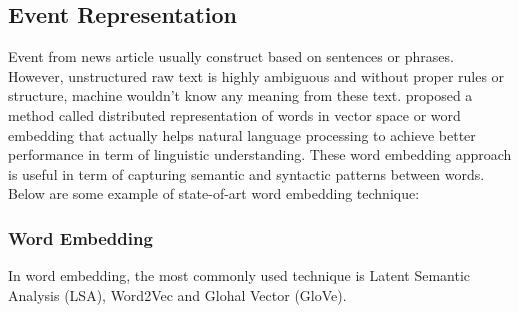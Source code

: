 \documentclass[twoside]{utmthesis}
\begin{document}
\subsection{Event Representation}
Event from news article usually construct based on sentences or phrases. However, unstructured raw text is highly ambiguous and without proper rules or structure, machine wouldn't know any meaning from these text. \citep{mikolov2013distributed} proposed a method called distributed representation of words in vector space or word embedding that actually helps natural language processing to achieve better performance in term of linguistic understanding. These word embedding approach is useful in term of capturing semantic and syntactic patterns between words. Below are some example of state-of-art word embedding technique: 

\subsubsection{Word Embedding}
In word embedding, the most commonly used technique is Latent Semantic Analysis (LSA), Word2Vec and Glohal Vector (GloVe). 
\end{document}

